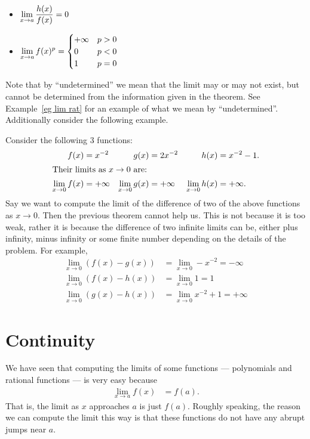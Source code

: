\begin{theorem}
\begin{itemize}
%

\item $\displaystyle \lim_{x \to a} \frac{h(x)}{f(x)} = 0$

\item $\displaystyle \lim_{x \to a} f(x)^p =
\begin{cases}
+\infty & p>0 \\
0 & p<0\\
1 & p=0
\end{cases}$
\end{itemize}
\end{theorem}
Note that by ``undetermined'' we mean that the limit may or may not exist, but
cannot be determined from the information given in the theorem. See
Example~\ref{eg lim rat} for an example of what we mean by
``undetermined''. Additionally consider the following example.
\begin{eg}\label{eg_1_5_4}
Consider the following 3 functions:
\begin{align*}
f(x)&=x^{-2} & g(x)&=2x^{-2} &h(x)&=x^{-2}-1. \\
\intertext{Their limits as $x \to 0$ are:}
\lim_{x\to0} f(x) &= +\infty &
\lim_{x\to0} g(x) &= +\infty &
\lim_{x\to0} h(x) &= +\infty.
\end{align*}
Say we want to compute the limit of the difference of two of the above functions as $x
\to 0$. Then the previous theorem cannot help us. This is not because it is too weak,
rather it is because the difference of two infinite limits can be, either plus infinity,
minus infinity or some finite number depending on the details of the problem. For example,
\begin{align*}
  \lim_{x\to0} \left( f(x)-g(x) \right) &= \lim_{x\to0} -x^{-2} = -\infty \\
  \lim_{x\to0} \left( f(x)-h(x) \right) &= \lim_{x\to0} 1 = 1 \\
  \lim_{x\to0} \left( g(x)-h(x) \right) &= \lim_{x\to0} x^{-2}+1 = +\infty
\end{align*}


\end{eg}






\section{Continuity}\label{sec_1_6}
We have seen that computing the limits of some functions --- polynomials and
rational functions --- is very easy because
\begin{align*}
  \lim_{x \to a} f(x) &= f(a).
\end{align*}
That is, the limit as $x$ approaches $a$ is just $f(a)$. Roughly speaking,
the reason we can compute the limit this way is that these functions do not
have any abrupt jumps near $a$.

